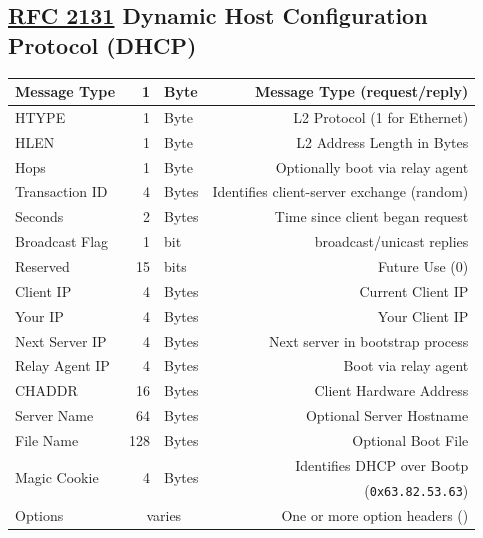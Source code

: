 \documentclass[12pt]{article}
\newcommand{\RFC}[1]{\href{https://datatracker.ietf.org/doc/html/rfc#1}{RFC #1}}
\newcommand{\mc}[3]{\multicolumn{#1}{#2}{#3}}
\newcommand{\mr}[2]{\multirow{#1}{*}{#2}}
\begin{document}
	\subsection[RFC 2131 DHCP]{\RFC{2131} Dynamic Host Configuration Protocol (DHCP) \label{subsec:DHCP}}
	\begin{table}[H]
	\centering
	\begin{tabular}{| l | r @{ } l | r |}\hline
	Message Type		& 1		& Byte		& Message Type (request/reply)\\\hline
	HTYPE			& 1		& Byte		& L2 Protocol (1 for Ethernet)\\\hline
	HLEN				& 1		& Byte		& L2 Address Length in Bytes\\\hline
	Hops				& 1		& Byte		& Optionally boot via relay agent\\\hline
	Transaction ID		& 4		& Bytes		& Identifies client-server exchange (random)\\\hline
	Seconds			& 2		& Bytes		& Time since client began request\\\hline
	Broadcast Flag		& 1		& bit 			& broadcast/unicast replies\\\hline
	Reserved			& 15		& bits		& Future Use (0)\\\hline
	Client IP			& 4		& Bytes		& Current Client IP\\\hline
	Your IP			& 4		& Bytes		& Your Client IP\\\hline
	Next Server IP		& 4		& Bytes		& Next server in bootstrap process\\\hline
	Relay Agent IP		& 4		& Bytes		& Boot via relay agent\\\hline
	CHADDR			& 16		& Bytes		& Client Hardware Address\\\hline
	Server Name		& 64		& Bytes		& Optional Server Hostname\\\hline
	File Name			& 128		& Bytes		& Optional Boot File\\\hline
	\mr{2}{Magic Cookie}	& \mr{2}{4}	& \mr{2}{Bytes}	& Identifies DHCP over Bootp\\
					&		&			& (\texttt{0x63.82.53.63})\\\hline
	Options			& \mc{2}{c|}{varies}		& One or more option headers (\Cref{tab:DHCP OPTIONS})\\\hline
	\end{tabular}\end{table}
\end{document}
